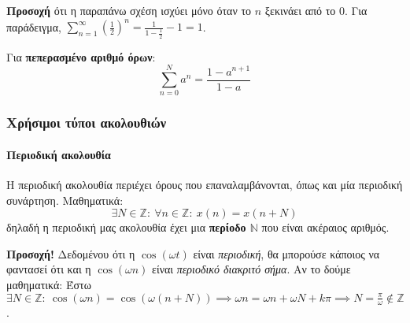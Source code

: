 \documentclass[11pt,a4paper,notitlepage,fleqn]{article}
\begin{document}
\textbf{Προσοχή} ότι η παραπάνω σχέση ισχύει μόνο όταν το \( n \) ξεκινάει από το 0. Για παράδειγμα,
\( \sum_{n=1}^\infty {\left(\frac{1}{2}\right)^n} = \frac{1}{1-\frac{1}{2}}-1 = 1 \).

Για \textbf{πεπερασμένο αριθμό όρων}:
\[
\sum_{n=0}^{N} a^n
= \frac{1-a^{n+1}}{1-a}
\]

\subsubsection{Χρήσιμοι τύποι ακολουθιών}
\paragraph{Περιοδική ακολουθία}
Η περιοδική ακολουθία περιέχει όρους που επαναλαμβάνονται, όπως και μία περιοδική συνάρτηση.
Μαθηματικά:
\[
\exists N \in \mathbb Z: \ \forall n \in \mathbb Z: \ x(n) = x(n+N)
\]
δηλαδή η περιοδική μας ακολουθία έχει μια \textbf{περίοδο \( \mathbb N \)} που είναι ακέραιος αριθμός.

\textbf{Προσοχή!} Δεδομένου ότι η \( \cos(\omega t) \) είναι \textit{περιοδική}, θα μπορούσε κάποιος
να φαντασεί ότι και η \( \cos(\omega n) \) είναι \textit{περιοδικό διακριτό σήμα}. Αν το δούμε μαθηματικά:
Έστω \( \exists N \in \mathbb Z:\ \cos(\omega n)=\cos\left( \omega (n+N) \right)
\implies \omega n = \omega n + \omega N + kπ \implies N = \frac{π}{\omega } \notin \mathbb Z \).
\end{document}
